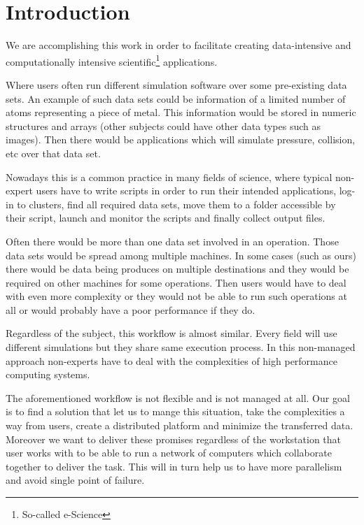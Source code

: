 \chapter{Introduction}
\label{cha:introduction}

We are accomplishing this work in order to facilitate creating data-intensive and computationally intensive 
scientific\footnote{So-called e-Science} applications.

Where users often run different simulation software over some pre-existing data sets.
An example of such data sets could be information of a limited number of atoms representing a piece of metal. 
This information would be stored in numeric structures and arrays 
(other subjects could have other data types such as images).
Then there would be applications which will simulate pressure, collision, etc over that data set.

Nowadays this is a common practice in many fields of science, 
where typical non-expert users have to write scripts in order to run their intended applications,
log-in to clusters, find all required data sets, move them to a folder
accessible by their script, launch and monitor the scripts and finally collect output files.

Often there would be more than one data set involved in an operation. 
Those data sets would be spread among multiple machines. 
In some cases (such as ours) there would be data being produces on multiple destinations and
they would be required on other machines for some operations.
Then users would have to deal with even more complexity or they would not be able to run
such operations at all or would probably have a poor performance if they do.

Regardless of the subject, this workflow is almost similar. 
Every field will use different simulations but they share same execution process.
In this non-managed approach non-experts have to deal with the complexities of high performance computing systems.

The aforementioned workflow is not flexible and is not managed at all. 
Our goal is to find a solution that let us to mange this situation, 
take the complexities a way from users, create a distributed platform and minimize the transferred data.
Moreover we want to deliver these promises regardless of the workstation that user works with to be
able to run a network of computers which collaborate together to deliver the task. 
This will in turn help us to have more parallelism and avoid single point of failure.

